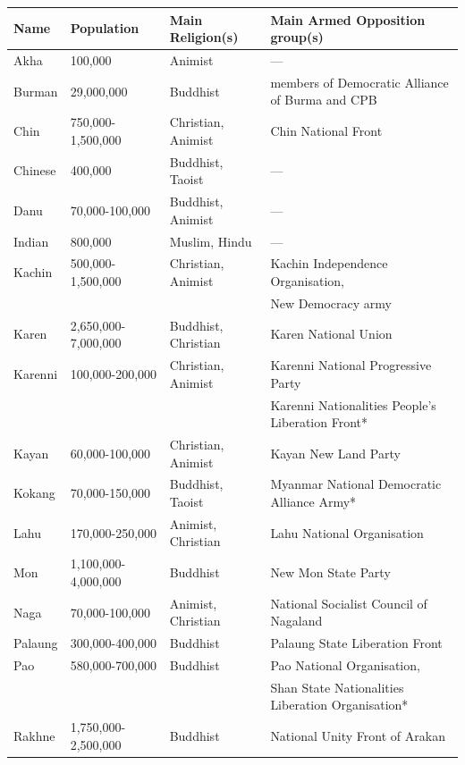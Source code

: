 \documentclass[man,floatsintext]{apa7}
\begin{document}
\begin{longtable}{@{}lllp{5.5cm}@{}}

\toprule
Name    & Population          & Main Religion(s)   & Main Armed Opposition group(s) \\
\midrule
Akha    & 100,000             & Animist            & --- \\
Burman  & 29,000,000          & Buddhist           & members of Democratic Alliance of Burma and CPB \\
Chin    & 750,000-1,500,000   & Christian, Animist & Chin National Front \\
Chinese & 400,000             & Buddhist, Taoist   & --- \\
Danu    & 70,000-100,000      & Buddhist, Animist  & --- \\
Indian  & 800,000             & Muslim, Hindu      & --- \\
Kachin  & 500,000-1,500,000   & Christian, Animist & Kachin Independence Organisation, \\
        &                     &                    & New Democracy army \\
Karen   & 2,650,000-7,000,000 & Buddhist, Christian & Karen National Union \\
Karenni & 100,000-200,000     & Christian, Animist & Karenni National Progressive Party \\
        &                     &                    & Karenni Nationalities People's Liberation Front* \\
Kayan   & 60,000-100,000      & Christian, Animist & Kayan New Land Party \\
Kokang  & 70,000-150,000      & Buddhist, Taoist   & Myanmar National Democratic Alliance Army* \\
Lahu    & 170,000-250,000     & Animist, Christian & Lahu National Organisation \\
Mon     & 1,100,000-4,000,000 & Buddhist           & New Mon State Party \\
Naga    & 70,000-100,000      & Animist, Christian & National Socialist Council of Nagaland \\
Palaung & 300,000-400,000     & Buddhist           & Palaung State Liberation Front \\
Pao     & 580,000-700,000     & Buddhist           & Pao National Organisation, \\
        &                     &                    & Shan State Nationalities Liberation Organisation* \\
Rakhne  & 1,750,000-2,500,000 & Buddhist           & National Unity Front of Arakan \\

\end{longtable}
\end{document}
